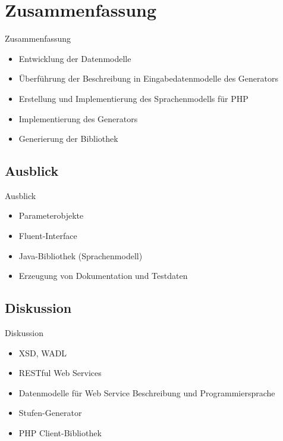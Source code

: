 \section{Zusammenfassung}

\begin{frame}{Zusammenfassung}
    \begin{itemize}
        \item Entwicklung der Datenmodelle
        \item Überführung der Beschreibung in Eingabedatenmodelle des Generators
        \item Erstellung und Implementierung des Sprachenmodells für PHP
        \item Implementierung des Generators
        \item Generierung der Bibliothek
    \end{itemize}
\end{frame}

\subsection{Ausblick}
\begin{frame}{Ausblick}
    \begin{itemize}
        \item Parameterobjekte
        \item {\color{gray} Fluent-Interface}
        \item Java-Bibliothek (Sprachenmodell)
        \item Erzeugung von Dokumentation und Testdaten
    \end{itemize}
\end{frame}

\subsection{Diskussion}
\begin{frame}{Diskussion}
    \begin{itemize}
        \item XSD, WADL
        \item RESTful Web Services
        \item Datenmodelle für Web Service Beschreibung und Programmiersprache
        \item Stufen-Generator
        \item PHP Client-Bibliothek
    \end{itemize}
\end{frame}